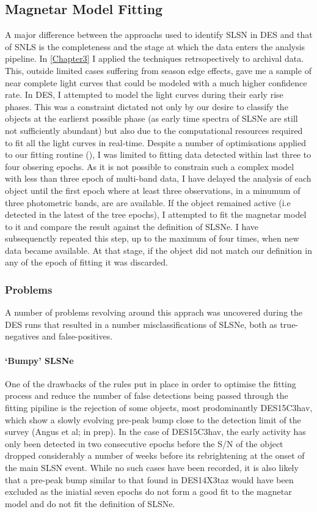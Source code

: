 \subsection{Magnetar Model Fitting}
A major difference between the approachs used to identify SLSN in DES and that of SNLS is the completeness and the stage at which the data enters the analysis pipeline. In \cref{Chapter3} I applied the techniques retrsopectively to archival data. This, outside limited cases suffering from season edge effects, gave me a sample of near complete light curves that could be modeled with a much higher confidence rate. In DES, I attempted to model the light curves during their early rise phases. This was a constraint dictated not only by our desire to classify the objects at the earlierst possible phase (as early time spectra of SLSNe are still not sufficiently abundant) but also due to the computational resources required to fit all the light curves in real-time. Despite a number of optimisations applied to our fitting routine (), I was limited to fitting data detected within last three to four obsering epochs. As it is not possible to constrain such a complex model with less than three epoch of multi-band data, I have delayed the analysis of each object until the first epoch where at least three observations, in a minumum of three photometric bands, are are available. If the object remained active (i.e detected in the latest of the tree epochs), I attempted to fit the magnetar model to it and compare the result against the definition of SLSNe. I have subsequenctly repeated this step, up to the maximum of four times, when new data became available. At that stage, if the object did not match our definition in any of the epoch of fitting it was discarded.

\subsubsection{Problems}
A number of problems revolving around this apprach was uncovered during the DES runs that resulted in a number misclassifications of SLSNe, both as true-negatives and false-positives.

\paragraph{`Bumpy' SLSNe}
One of the drawbacks of the rules put in place in order to optimise the fitting process and reduce the number of false detections being passed through the fitting pipiline is the rejection of some objects, most prodominantly DES15C3hav, which show a slowly evolving pre-peak bump close to the detection limit of the survey (Angus et al; in prep). In the case of DES15C3hav, the early activity has only been detected in two consecutive epochs before the S/N of the object dropped considerably a number of weeks before its rebrightening at the onset of the main SLSN event. While no such cases have been recorded, it is also likely that a pre-peak bump similar to that found in DES14X3taz would have been excluded as the iniatial seven epochs do not form a good fit to the magnetar model and do not fit the definition of SLSNe.


